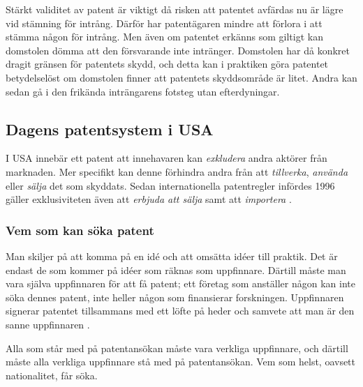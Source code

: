 
Stärkt validitet av patent är viktigt då risken att patentet avfärdas nu är lägre vid stämning för
intrång. Därför har patentägaren mindre att förlora i att stämma någon för intrång. Men
även om patentet erkänns som giltigt kan domstolen dömma att den försvarande inte intränger.
Domstolen har då konkret dragit gränsen för patentets skydd, och detta kan i praktiken göra patentet
betydelselöst om domstolen finner att patentets skyddsområde är litet. Andra kan sedan gå i den frikända
inträngarens fotsteg utan efterdyningar\cite{henry}.




\subsection{Dagens patentsystem i USA}

I USA innebär ett patent att innehavaren kan \emph{exkludera} andra aktörer från marknaden. Mer specifikt kan denne förhindra andra från att \emph{tillverka}, \emph{använda} eller \emph{sälja} det som skyddats. Sedan internationella patentregler infördes 1996 gäller exklusiviteten även att \emph{erbjuda att sälja} samt att \emph{importera} \cite{cmu-overview}.


\subsubsection{Vem som kan söka patent}

Man skiljer på att komma på en idé och att omsätta idéer till praktik. Det är endast de som kommer på idéer som räknas som uppfinnare. Därtill måste man vara själva uppfinnaren för att få patent; ett företag som anställer någon kan inte söka dennes patent, inte heller någon som finansierar forskningen. Uppfinnaren signerar patentet tillsammans med ett löfte på heder och samvete att man är den sanne uppfinnaren \cite{cmu-overview}.

Alla som står med på patentansökan måste vara verkliga uppfinnare, och därtill måste alla verkliga uppfinnare stå med på patentansökan. Vem som helst, oavsett nationalitet, får söka.



